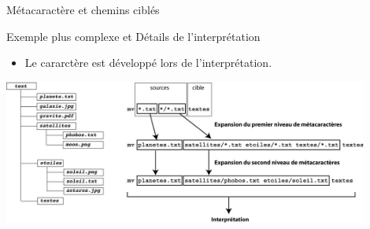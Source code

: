 \begin{frame}{Métacaractère et chemins ciblés}
  \begin{block}{Exemple plus complexe et Détails de l'interprétation}
    \begin{itemize}
    \item Le cararctère \lin{*} est développé lors de l'interprétation.
    \end{itemize}
  \end{block}
  \begin{center}
    \includegraphics[width=12cm]{img/s02/star_met_mv_interp.jpg}
  \end{center}
\end{frame}

